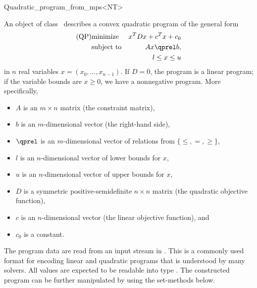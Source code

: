 \begin{ccRefClass}{Quadratic_program_from_mps<NT>}


\ccDefinition
An object of class \ccRefName\ describes a convex quadratic program of the 
general form
\begin{eqnarray*}
\mbox{(QP)}& \mbox{minimize} & x^{T}Dx+c^{T}x+c_0 \\
&\mbox{subject to}   & Ax\qprel b, \\
&                    & l \leq x \leq u
\end{eqnarray*}
in $n$ real variables $x=(x_0,\ldots,x_{n-1})$. If $D=0$, the program is
a linear program; if the variable bounds are $x\geq 0$, we have a 
nonnegative program. More specifically,  
\begin{itemize}
\item $A$ is an $m\times n$ matrix (the constraint matrix), 
\item $b$ is an $m$-dimensional vector (the right-hand side),
\item $\qprel$ is an $m$-dimensional vector of relations 
from $\{\leq, =, \geq\}$, 
\item $l$ is an $n$-dimensional vector of lower
bounds for $x$,
\item $u$ is an $n$-dimensional vector of upper bounds for
$x$, 
\item $D$ is a symmetric positive-semidefinite $n\times n$ matrix (the
  quadratic objective function),
\item $c$ is an $n$-dimensional vector (the linear objective
  function), and 
\item $c_0$ is a constant.
\end{itemize}

The program data are read from an input stream in . This is
a commonly used format for encoding linear and quadratic programs that
is understood by many solvers. All values are expected to be readable
into type . The constructed program can be further manipulated 
by using the set-methods below.

\ccIsModel
{}\\
\\
\\

\ccTypes
{}


\end{ccRefClass}
